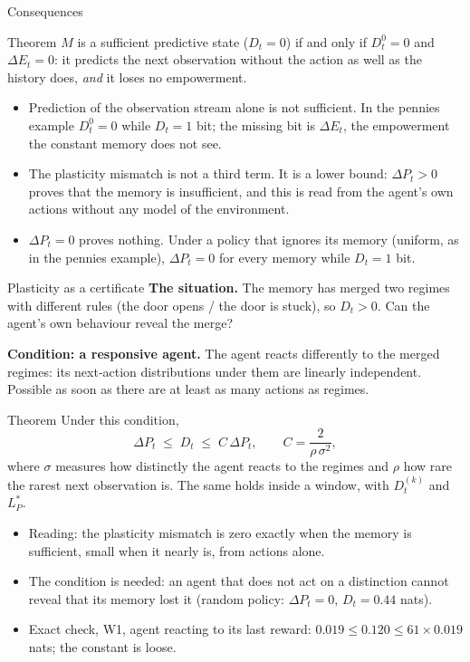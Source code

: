 \documentclass[11pt,aspectratio=169]{beamer}
\newcommand{\dE}{\Delta E}
\newcommand{\dP}{\Delta P}
\begin{document}
\begin{frame}{Consequences}
\begin{block}{Theorem}
$M$ is a sufficient predictive state ($D_t = 0$) if and only if $D^0_t = 0$ and $\dE_t = 0$: it predicts the next observation without the action as well as the history does, \emph{and} it loses no empowerment.
\end{block}
\vspace{2mm}
\begin{itemize}
\item Prediction of the observation stream alone is not sufficient. In the pennies example $D^0_t = 0$ while $D_t = 1$ bit; the missing bit is $\dE_t$, the empowerment the constant memory does not see.
\item The plasticity mismatch is not a third term. It is a lower bound: $\dP_t > 0$ proves that the memory is insufficient, and this is read from the agent's own actions without any model of the environment.
\item $\dP_t = 0$ proves nothing. Under a policy that ignores its memory (uniform, as in the pennies example), $\dP_t = 0$ for every memory while $D_t = 1$ bit.
\end{itemize}
\end{frame}

\begin{frame}[shrink=10]{Plasticity as a certificate}
\textbf{The situation.} The memory has merged two regimes with different rules (the door opens / the door is stuck), so $D_t > 0$. Can the agent's own behaviour reveal the merge?

\medskip
\textbf{Condition: a responsive agent.} The agent reacts differently to the merged regimes: its next-action distributions under them are linearly independent. Possible as soon as there are at least as many actions as regimes.

\medskip
\begin{block}{Theorem}
Under this condition,
\[
\Delta P_t \;\le\; D_t \;\le\; C\,\Delta P_t, \qquad C = \frac{2}{\rho\,\sigma^2},
\]
where $\sigma$ measures how distinctly the agent reacts to the regimes and $\rho$ how rare the rarest next observation is. The same holds inside a window, with $D^{(k)}_t$ and $L^*_P$.
\end{block}
\vspace{2mm}
\begin{itemize}
\item Reading: the plasticity mismatch is zero exactly when the memory is sufficient, small when it nearly is, from actions alone.
\item The condition is needed: an agent that does not act on a distinction cannot reveal that its memory lost it (random policy: $\Delta P_t = 0$, $D_t = 0.44$ nats).
\item Exact check, W1, agent reacting to its last reward: $0.019 \le 0.120 \le 61 \times 0.019$ nats; the constant is loose.
\end{itemize}
\end{frame}
\end{document}
